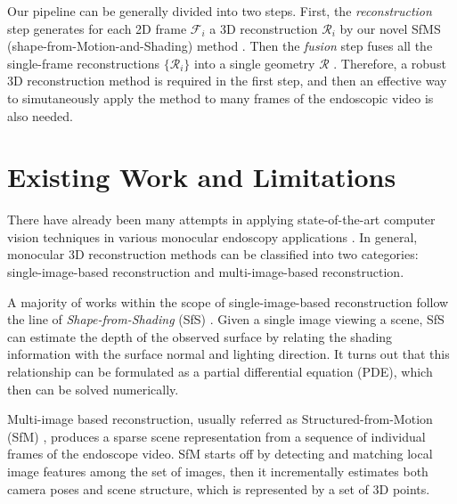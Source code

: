\documentclass{llncs}
\begin{document}
Our pipeline can be generally divided into two steps. First, the \textit{reconstruction} step generates for each 2D frame $\mathcal{F}_i$ a 3D reconstruction $\mathcal{R}_i$ by our novel SfMS (shape-from-Motion-and-Shading) method \cite{price16}. Then the \textit{fusion} step fuses all the single-frame reconstructions $\{\mathcal{R}_i\}$ into a single geometry $\mathcal{R}$ \cite{zhao16}. Therefore, a robust 3D reconstruction method is required in the first step, and then an effective way to simutaneously apply the method to many frames of the endoscopic video is also needed.


\section{Existing Work and Limitations}

There have already been many attempts in applying state-of-the-art computer vision techniques in various monocular endoscopy applications \cite{armin2015,hong2014,MH2013}. In general, monocular 3D reconstruction methods can be classified into two categories: single-image-based reconstruction and multi-image-based reconstruction.

A majority of works within the scope of single-image-based reconstruction follow the line of \textit{Shape-from-Shading} (SfS) \cite{ahmed2006}. Given a single image viewing a scene, SfS can estimate the depth of the observed surface by relating the shading information with the surface normal and lighting direction. It turns out that this relationship can be formulated as a partial differential equation (PDE), which then can be solved numerically.

Multi-image based reconstruction, usually referred as Structured-from-Motion (SfM) \cite{schonberger2016}, produces a sparse scene representation from a sequence of individual frames of the endoscope video. SfM starts off by detecting and matching local image features among the set of images, then it incrementally estimates both camera poses and scene structure, which is represented by a set of 3D points.
\end{document}
